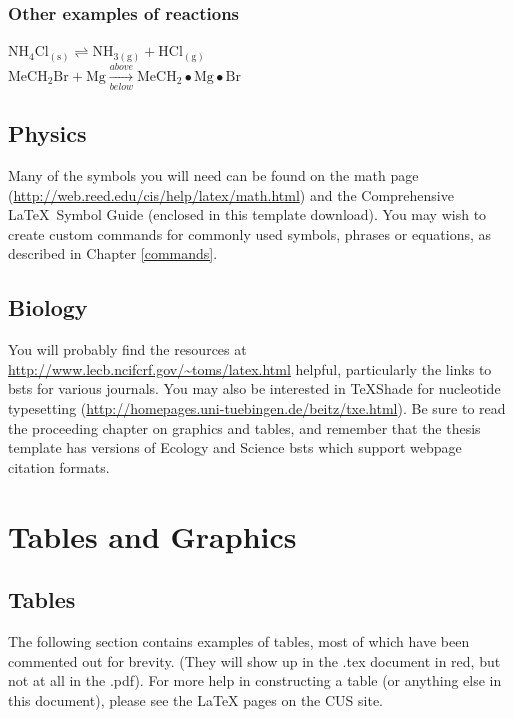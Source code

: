 \documentclass[12pt,twoside]{reedthesis}
\begin{document}
\subsection{Other examples of reactions}
$\mathrm{NH_4Cl_{(s)}} \rightleftharpoons \mathrm{NH_{3(g)}+HCl_{(g)}}$\\
$\mathrm{MeCH_2Br + Mg} \xrightarrow[below]{above} \mathrm{MeCH_2\bullet Mg \bullet Br}$

\section{Physics}

Many of the symbols you will need can be found on the math page (\url{http://web.reed.edu/cis/help/latex/math.html}) and the Comprehensive \LaTeX\ Symbol Guide (enclosed in this template download).  You may wish to create custom commands for commonly used symbols, phrases or equations, as described in Chapter \ref{commands}.

\section{Biology}
You will probably find the resources at \url{http://www.lecb.ncifcrf.gov/~toms/latex.html} helpful, particularly the links to bsts for various journals. You may also be interested in TeXShade for nucleotide typesetting (\url{http://homepages.uni-tuebingen.de/beitz/txe.html}).  Be sure to read the proceeding chapter on graphics and tables, and remember that the thesis template has versions of Ecology and Science bsts which support webpage citation formats. 

\chapter{Tables and Graphics}

\section{Tables}
	The following section contains examples of tables, most of which have been commented out for brevity. (They will show up in the .tex document in red, but not at all in the .pdf). For more help in constructing a table (or anything else in this document), please see the LaTeX pages on the CUS site. 
\end{document}
